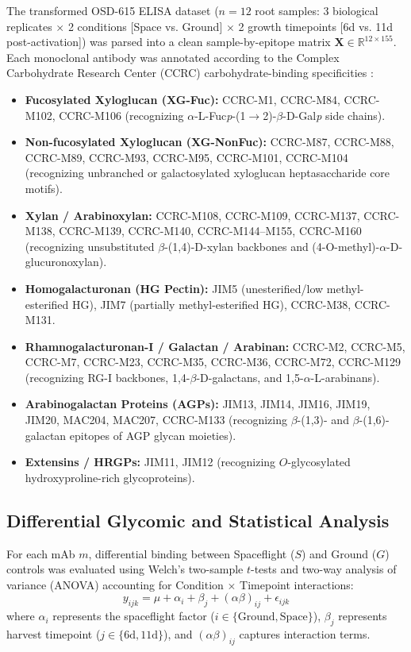 The transformed OSD-615 ELISA dataset ($n = 12$ root samples: 3 biological replicates $\times$ 2 conditions [Space vs. Ground] $\times$ 2 growth timepoints [6d vs. 11d post-activation]) was parsed into a clean sample-by-epitope matrix $\mathbf{X} \in \mathbb{R}^{12 \times 155}$. Each monoclonal antibody was annotated according to the Complex Carbohydrate Research Center (CCRC) carbohydrate-binding specificities \cite{Pattathil2010}:
\begin{itemize}
    \item \textbf{Fucosylated Xyloglucan (XG-Fuc):} CCRC-M1, CCRC-M84, CCRC-M102, CCRC-M106 (recognizing $\alpha$-L-Fuc\textit{p}-(1$\to$2)-$\beta$-D-Gal\textit{p} side chains).
    \item \textbf{Non-fucosylated Xyloglucan (XG-NonFuc):} CCRC-M87, CCRC-M88, CCRC-M89, CCRC-M93, CCRC-M95, CCRC-M101, CCRC-M104 (recognizing unbranched or galactosylated xyloglucan heptasaccharide core motifs).
    \item \textbf{Xylan / Arabinoxylan:} CCRC-M108, CCRC-M109, CCRC-M137, CCRC-M138, CCRC-M139, CCRC-M140, CCRC-M144--M155, CCRC-M160 (recognizing unsubstituted $\beta$-(1,4)-D-xylan backbones and (4-O-methyl)-$\alpha$-D-glucuronoxylan).
    \item \textbf{Homogalacturonan (HG Pectin):} JIM5 (unesterified/low methyl-esterified HG), JIM7 (partially methyl-esterified HG), CCRC-M38, CCRC-M131.
    \item \textbf{Rhamnogalacturonan-I / Galactan / Arabinan:} CCRC-M2, CCRC-M5, CCRC-M7, CCRC-M23, CCRC-M35, CCRC-M36, CCRC-M72, CCRC-M129 (recognizing RG-I backbones, 1,4-$\beta$-D-galactans, and 1,5-$\alpha$-L-arabinans).
    \item \textbf{Arabinogalactan Proteins (AGPs):} JIM13, JIM14, JIM16, JIM19, JIM20, MAC204, MAC207, CCRC-M133 (recognizing $\beta$-(1,3)- and $\beta$-(1,6)-galactan epitopes of AGP glycan moieties).
    \item \textbf{Extensins / HRGPs:} JIM11, JIM12 (recognizing $O$-glycosylated hydroxyproline-rich glycoproteins).
\end{itemize}

\subsection{Differential Glycomic and Statistical Analysis}

For each mAb $m$, differential binding between Spaceflight ($S$) and Ground ($G$) controls was evaluated using Welch's two-sample $t$-tests and two-way analysis of variance (ANOVA) accounting for Condition $\times$ Timepoint interactions:
\begin{equation}
    y_{ijk} = \mu + \alpha_i + \beta_j + (\alpha\beta)_{ij} + \epsilon_{ijk}
\end{equation}
where $\alpha_i$ represents the spaceflight factor ($i \in \{\text{Ground}, \text{Space}\}$), $\beta_j$ represents harvest timepoint ($j \in \{6\text{d}, 11\text{d}\}$), and $(\alpha\beta)_{ij}$ captures interaction terms.

